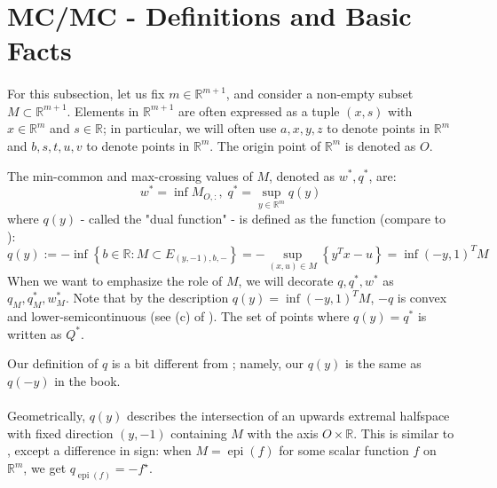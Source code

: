 \section{MC/MC - Definitions and Basic Facts}
\label{sect:031}

\paragraph{}For this subsection, let us fix $m\in \mathbb{R}^{m+1}$, and consider a non-empty subset $M\subset \mathbb{R}^{m+1}$. Elements in $\mathbb{R}^{m+1}$ are often expressed as a tuple $(x,s)$ with $x\in \mathbb{R}^m$ and $s\in \mathbb{R}$; in particular, we will often use $a,x,y,z$ to denote points in $\mathbb{R}^m$ and $b,s,t,u,v$ to denote points in $\mathbb{R}^m$. The origin point of $\mathbb{R}^m$ is denoted as $O$.

\begin{defn}[MC/MC]\label{defn:031-mc-mc}
	The min-common and max-crossing values of $M$, denoted as $w^\ast,q^\ast$, are:
	\[
		w^\ast = \inf M_{O,:},\; q^\ast = \sup_{y\in \mathbb{R}^m} q(y)
	\]
	where $q(y)$ - called the "dual function" - is defined as the function (compare to ):
	\[
		q(y):= -\inf\left\{ b\in \mathbb{R}: M\subset E_{(y,-1),b,-} \right\} = - \sup_{(x,u)\in M}\left\{y^Tx-u\right\} = \inf (-y,1)^TM
	\]
	When we want to emphasize the role of $M$, we will decorate $q,q^\ast,w^\ast$ as $q_M,q^\ast_M,w^\ast_M$. Note that by the description $q(y) =\inf (-y,1)^TM$, $-q$ is convex and lower-semicontinuous (see (c) of ). The set of points where $q(y)=q^\ast$ is written as $Q^\ast$.
\end{defn}

\begin{rmrk}
	Our definition of $q$ is a bit different from \cite{bertsekas2009convex}; namely, our $q(y)$ is the same as $q(-y)$ in the book.
\end{rmrk}

\paragraph{}Geometrically, $q(y)$ describes the intersection of an upwards extremal halfspace with fixed direction $(y,-1)$ containing $M$ with the axis $O\times \mathbb{R}$. This is similar to , except a difference in sign: when $M=\operatorname{epi}(f)$ for some scalar function $f$ on $\mathbb{R}^m$, we get $q_{\operatorname{epi}(f)}=-f^\star$.

